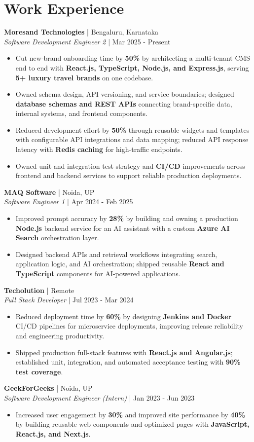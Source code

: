 \documentclass[a4paper,10pt]{article}
\newcommand{\role}[4]{\textbf{#1} | #2\\\textit{#3} | #4\par}
\begin{document}
\section{Work Experience}
\role{Moresand Technologies}{Bengaluru, Karnataka}{Software Development Engineer 2}{Mar 2025 - Present}
\begin{itemize}
\item Cut new-brand onboarding time by \textbf{50\%} by architecting a multi-tenant CMS end to end with \textbf{React.js, TypeScript, Node.js, and Express.js}, serving \textbf{5+ luxury travel brands} on one codebase.
\item Owned schema design, API versioning, and service boundaries; designed \textbf{database schemas and REST APIs} connecting brand-specific data, internal systems, and frontend components.
\item Reduced development effort by \textbf{50\%} through reusable widgets and templates with configurable API integrations and data mapping; reduced API response latency with \textbf{Redis caching} for high-traffic endpoints.
\item Owned unit and integration test strategy and \textbf{CI/CD} improvements across frontend and backend services to support reliable production deployments.
\end{itemize}
\role{MAQ Software}{Noida, UP}{Software Engineer 1}{Apr 2024 - Feb 2025}
\begin{itemize}
\item Improved prompt accuracy by \textbf{28\%} by building and owning a production \textbf{Node.js} backend service for an AI assistant with a custom \textbf{Azure AI Search} orchestration layer.
\item Designed backend APIs and retrieval workflows integrating search, application logic, and AI orchestration; shipped reusable \textbf{React and TypeScript} components for AI-powered applications.
\end{itemize}
\role{Techolution}{Remote}{Full Stack Developer}{Jul 2023 - Mar 2024}
\begin{itemize}
\item Reduced deployment time by \textbf{60\%} by designing \textbf{Jenkins and Docker} CI/CD pipelines for microservice deployments, improving release reliability and engineering productivity.
\item Shipped production full-stack features with \textbf{React.js and Angular.js}; established unit, integration, and automated acceptance testing with \textbf{90\% test coverage}.
\end{itemize}
\role{GeekForGeeks}{Noida, UP}{Software Development Engineer (Intern)}{Jan 2023 - Jun 2023}
\begin{itemize}
\item Increased user engagement by \textbf{30\%} and improved site performance by \textbf{40\%} by building reusable web components and optimized pages with \textbf{JavaScript, React.js, and Next.js}.
\end{itemize}
\end{document}
